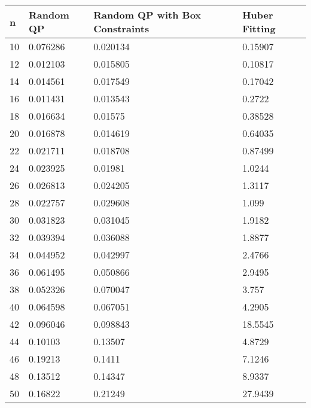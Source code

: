 \begin{tabular}{llll}
n & Random QP & Random QP with Box Constraints & Huber Fitting \\ 
\hline 
10 & 0.076286 & 0.020134 & 0.15907 \\ 
12 & 0.012103 & 0.015805 & 0.10817 \\ 
14 & 0.014561 & 0.017549 & 0.17042 \\ 
16 & 0.011431 & 0.013543 & 0.2722 \\ 
18 & 0.016634 & 0.01575 & 0.38528 \\ 
20 & 0.016878 & 0.014619 & 0.64035 \\ 
22 & 0.021711 & 0.018708 & 0.87499 \\ 
24 & 0.023925 & 0.01981 & 1.0244 \\ 
26 & 0.026813 & 0.024205 & 1.3117 \\ 
28 & 0.022757 & 0.029608 & 1.099 \\ 
30 & 0.031823 & 0.031045 & 1.9182 \\ 
32 & 0.039394 & 0.036088 & 1.8877 \\ 
34 & 0.044952 & 0.042997 & 2.4766 \\ 
36 & 0.061495 & 0.050866 & 2.9495 \\ 
38 & 0.052326 & 0.070047 & 3.757 \\ 
40 & 0.064598 & 0.067051 & 4.2905 \\ 
42 & 0.096046 & 0.098843 & 18.5545 \\ 
44 & 0.10103 & 0.13507 & 4.8729 \\ 
46 & 0.19213 & 0.1411 & 7.1246 \\ 
48 & 0.13512 & 0.14347 & 8.9337 \\ 
50 & 0.16822 & 0.21249 & 27.9439 \\ 
\hline 
\end{tabular}